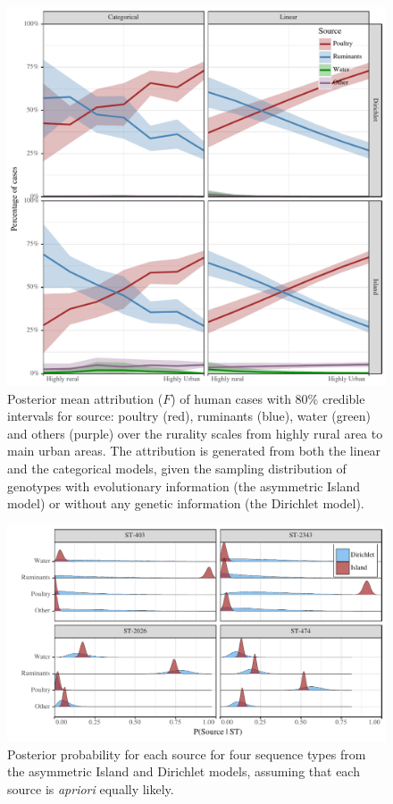 \documentclass[times, doublespace]{simauth}%
\begin{document}
\begin{figure}
\centering
\includegraphics[width=.8\linewidth]{Figures/attr_all.pdf}
\caption{Posterior mean attribution ($F$) of human cases with 80\% credible intervals for source: poultry (red), ruminants (blue), water (green) and others (purple) over the rurality scales from highly rural area to main urban areas. The attribution is generated from both the linear and the categorical models, given the sampling distribution of genotypes with evolutionary information (the asymmetric Island model) or without any genetic information (the Dirichlet model).}
\label{fig2}
\end{figure}

\begin{figure}
\centering
\includegraphics[width=.8\linewidth]{Figures/genotype_figure.pdf}
\caption{Posterior probability for each source for four sequence types from the asymmetric Island and Dirichlet models, assuming that each source is \emph{apriori} equally likely.}
\label{fig:genotype_dist}
\end{figure}
\end{document}

